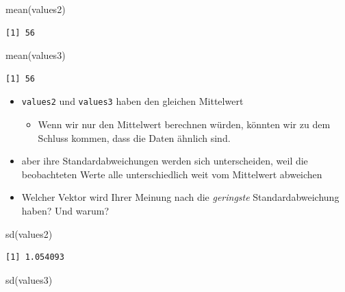 \documentclass[
  letterpaper,
  DIV=11]{scrartcl}
\newenvironment{Shaded}{\begin{snugshade}}{\end{snugshade}}
\newcommand{\FunctionTok}[1]{\textcolor[rgb]{0.28,0.35,0.67}{#1}}
\newcommand{\NormalTok}[1]{\textcolor[rgb]{0.00,0.23,0.31}{#1}}
\providecommand{\tightlist}{%
  \setlength{\itemsep}{0pt}\setlength{\parskip}{0pt}}\usepackage{longtable,booktabs,array}
\begin{document}
\begin{Shaded}
\begin{Highlighting}[]
\FunctionTok{mean}\NormalTok{(values2)}
\end{Highlighting}
\end{Shaded}

\begin{verbatim}
[1] 56
\end{verbatim}

\begin{Shaded}
\begin{Highlighting}[]
\FunctionTok{mean}\NormalTok{(values3)}
\end{Highlighting}
\end{Shaded}

\begin{verbatim}
[1] 56
\end{verbatim}

\begin{itemize}
\tightlist
\item
  \texttt{values2} und \texttt{values3} haben den gleichen Mittelwert

  \begin{itemize}
  \tightlist
  \item
    Wenn wir nur den Mittelwert berechnen würden, könnten wir zu dem
    Schluss kommen, dass die Daten ähnlich sind.
  \end{itemize}
\item
  aber ihre Standardabweichungen werden sich unterscheiden, weil die
  beobachteten Werte alle unterschiedlich weit vom Mittelwert abweichen
\item
  Welcher Vektor wird Ihrer Meinung nach die \emph{geringste}
  Standardabweichung haben? Und warum?
\end{itemize}

\begin{Shaded}
\begin{Highlighting}[]
\FunctionTok{sd}\NormalTok{(values2)}
\end{Highlighting}
\end{Shaded}

\begin{verbatim}
[1] 1.054093
\end{verbatim}

\begin{Shaded}
\begin{Highlighting}[]
\FunctionTok{sd}\NormalTok{(values3)}
\end{Highlighting}
\end{Shaded}
\end{document}

